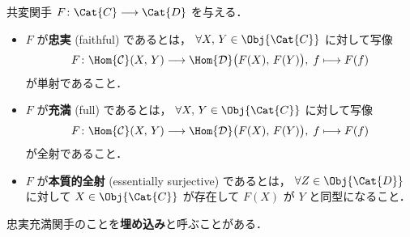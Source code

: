 \documentclass[algtopo_main]{subfiles}
\begin{document}
\begin{mydef}[label=def:faithful]{}
    共変関手 $F \colon \Cat{C} \longrightarrow \Cat{D}$ を与える．
    \begin{itemize}
        \item $F$ が\textbf{忠実} (faithful) であるとは， $\forall X,\,Y \in \Obj{\Cat{C}}$ に対して写像
        \begin{align}
            F \colon \Hom{\mathcal{C}}(X,\, Y) \longrightarrow \Hom{\mathcal{D}} \bigl( F(X),\, F(Y) \bigr),\; f \longmapsto F(f)
        \end{align}
        が単射であること．
        \item $F$ が\textbf{充満} (full) であるとは， $\forall X,\,Y \in \Obj{\Cat{C}}$ に対して写像
        \begin{align}
            F \colon \Hom{\mathcal{C}}(X,\, Y) \longrightarrow \Hom{\mathcal{D}} \bigl( F(X),\, F(Y) \bigr),\; f \longmapsto F(f)
        \end{align}
        が全射であること．
        \item $F$ が\textbf{本質的全射} (essentially surjective) であるとは， $\forall Z \in \Obj{\Cat{D}}$ に対して $X \in \Obj{\Cat{C}}$ が存在して $F(X)$ が $Y$ と同型になること．
    \end{itemize}
    忠実充満関手のことを\textbf{埋め込み}と呼ぶことがある．
\end{mydef}
\end{document}
